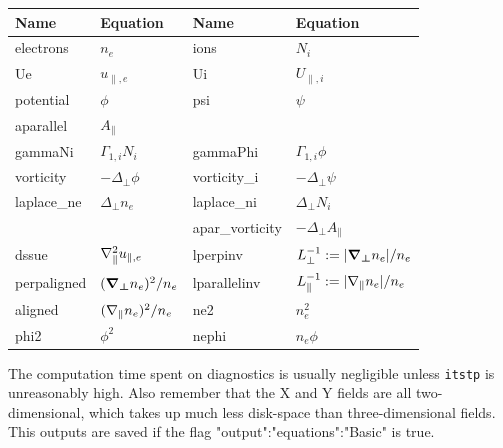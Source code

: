 \begin{longtable}{llll}
\toprule
\rowcolor{gray!50}\textbf{Name} &  \textbf{Equation} & \textbf{Name} &  \textbf{Equation}\\
\midrule
    electrons &$n_e$ &
    ions &$N_i$ \\
    Ue &$u_{\parallel,e}$ &
    Ui &$U_{\parallel,i}$ \\
    potential &$\phi$ &
    psi &$\psi$ \\
    aparallel &$A_\parallel$ & \\
    gammaNi & $\Gamma_{1,i} N_i$  &
    gammaPhi & $\Gamma_{1,i} \phi$  \\
    vorticity &$-\Delta_\perp\phi$ &
    vorticity\_i & $-\Delta_\perp \psi$ \\
    laplace\_ne &$\Delta_\perp n_e$ &
    laplace\_ni & $\Delta_\perp N_i$ \\
     & &
    apar\_vorticity &$-\Delta_\perp A_\parallel$ \\
    dssue & $\nabla_\parallel^2 u_{\parallel,e}$&
    lperpinv &$L_\perp^{-1} := |{\boldsymbol{{\boldsymbol{\nabla}}_{\perp}}} n_e|/n_e$ \\
    perpaligned &$({\boldsymbol{{\boldsymbol{\nabla}}_{\perp}}} n_e)^2/n_e$ &
    lparallelinv &$L_\parallel^{-1} := |\nabla_\parallel n_e|/n_e$ \\
    aligned &$ (\nabla_\parallel n_e)^2/n_e$ &
    ne2 & $n_e^2$ \\
    phi2 & $\phi^2$ &
    nephi & $n_e\phi$ \\
\bottomrule
\end{longtable}
The computation time spent on diagnostics is usually negligible unless {\tt itstp}
is unreasonably high. Also remember that the X and Y fields are all
two-dimensional, which takes up much less disk-space than three-dimensional
fields. This outputs are saved if the flag "output":"equations":"Basic" is true.

